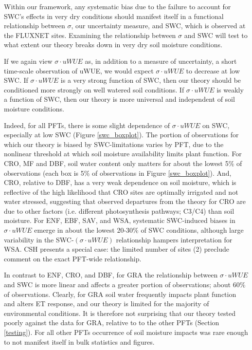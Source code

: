\documentclass[draft,linenumbers]{afmjournal}
\begin{document}
Within our framework, any systematic bias due to the
failure to account for SWC's effects in very dry conditions should
manifest itself in a functional relationship between $\sigma$, our
uncertainty measure, and SWC, which is observed at the FLUXNET
sites. Examining the relationship between $\sigma$ and SWC will test
to what extent our theory breaks down in very dry soil moisture
conditions.

If we again view $\sigma \cdot uWUE$ as, in addition to a measure of
uncertainty, a short time-scale observation of uWUE, we would expect
$\sigma \cdot uWUE$ to decrease at low SWC. If $\sigma \cdot uWUE$ is
a very strong function of SWC, then our theory should be conditioned
more strongly on well watered soil conditions. If $\sigma \cdot uWUE$
is weakly a function of SWC, then our theory is more universal and
independent of soil moisture conditions.

Indeed, for all PFTs, there is some slight dependence of
$\sigma \cdot uWUE$ on SWC, especially at low SWC (Figure
\ref{swc_boxplot}). The portion of observations for which our theory
is biased by SWC-limitations varies by PFT, due to the nonlinear
threshold at which soil moisture availability limits plant
function. For CRO, MF and DBF, soil water content only matters for
about the lowest 5\% of observations (each box is 5\% of observations
in Figure \ref{swc_boxplot}). And, CRO, relative to DBF, has a very
weak dependence on soil moisture, which is reflective of the high
likelihood that CRO sites are optimally irrigated and not water
stressed, suggesting that observed departures from the theory for CRO
are due to other factors (i.e. different photosynthesis pathways; C3/C4) than soil
moisture. For ENF, EBF, SAV, and WSA, systematic SWC-induced biases in
$\sigma \cdot uWUE$ emerge in about the lowest 20-30\% of SWC
conditions, although large variability in the SWC-$(\sigma \cdot uWUE)$
relationship hampers interpretation for WSA. CSH presents a special
case: the limited number of sites (2) preclude comment on the
exact PFT-wide relationship.

In contrast to ENF, CRO, and DBF, for GRA the relationship between
$\sigma \cdot uWUE$ and SWC is more linear and affects a greater
portion of observations; about 60\% of observations. Clearly, for GRA
soil water frequently impacts plant function and alters ET response,
and our theory is limited for the majority of environmental
conditions. It is therefore not surprising that our theory tested
poorly against the data for GRA, relative to to the other PFTs
(Section \ref{testing}). For all other PFTs occurrence of soil
moisture impacts was rare enough to not manifest itself in bulk
statistics and figures.
\end{document}
